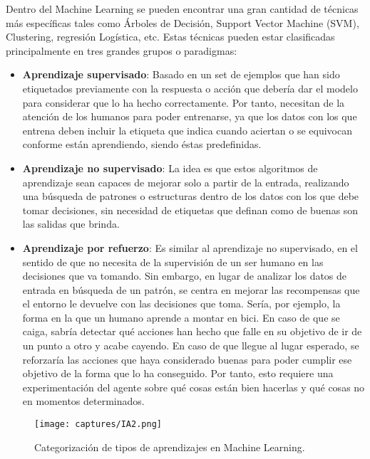 \documentclass[11pt,fleqn]{book} %
\begin{document}
Dentro del Machine Learning se pueden encontrar una gran cantidad de técnicas más específicas tales como Árboles de Decisión, Support Vector Machine (SVM), Clustering, regresión Logística, etc. Estas técnicas pueden estar clasificadas principalmente en tres grandes grupos o paradigmas: \cite{book:alphago} \\

\begin{itemize}
	\item \textbf{Aprendizaje supervisado}: Basado en un set de ejemplos que han sido etiquetados previamente con la respuesta o acción que debería dar el modelo para considerar que lo ha hecho correctamente. Por tanto, necesitan de la atención de los humanos para poder entrenarse, ya que los datos con los que entrena deben incluir la etiqueta que indica cuando aciertan o se equivocan conforme están aprendiendo, siendo éstas predefinidas. \\
	 
	\item \textbf{Aprendizaje no supervisado}: La idea es que estos algoritmos de aprendizaje sean capaces de mejorar solo a partir de la entrada, realizando una búsqueda de patrones o estructuras dentro de los datos con los que debe tomar decisiones, sin necesidad de etiquetas que definan como de buenas son las salidas que brinda. \\
	
	\item \textbf{Aprendizaje por refuerzo}: Es similar al aprendizaje no supervisado, en el sentido de que no necesita de la supervisión de un ser humano en las decisiones que va tomando. Sin embargo, en lugar de analizar los datos de entrada en búsqueda de un patrón, se centra en mejorar las recompensas que el entorno le devuelve con las decisiones que toma. Sería, por ejemplo, la forma en la que un humano aprende a montar en bici. En caso de que se caiga, sabría detectar qué acciones han hecho que falle en su objetivo de ir de un punto a otro y acabe cayendo. En caso de que llegue al lugar esperado, se reforzaría las acciones que haya considerado buenas para poder cumplir ese objetivo de la forma que lo ha conseguido. Por tanto, esto requiere una experimentación del agente sobre qué cosas están bien hacerlas y qué cosas no en momentos determinados. \\
	
\end{itemize}

\begin{figure}[H]
	\centering\texttt{[image: captures/IA2.png]}
	\caption{Categorización de tipos de aprendizajes en Machine Learning.}
	\label{fig:IA2} %
\end{figure}
\end{document}

